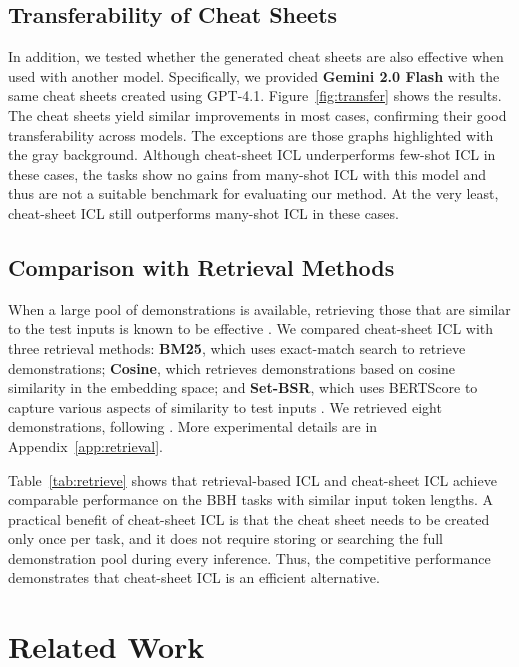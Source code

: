 \documentclass[11pt]{article}
\begin{document}
\subsection{Transferability of Cheat Sheets}
\label{sec:transfer}
In addition, we tested whether the generated cheat sheets are also effective when used with another model.
Specifically, we provided \textbf{Gemini 2.0 Flash} with the same cheat sheets created using GPT-4.1.
Figure~\ref{fig:transfer} shows the results.
The cheat sheets yield similar improvements in most cases, confirming their good transferability across models.
The exceptions are those graphs highlighted with the \colorbox{backgray}{gray background}.
Although cheat-sheet ICL underperforms few-shot ICL in these cases, the tasks show no gains from many-shot ICL with this model and thus are not a suitable benchmark for evaluating our method.
At the very least, cheat-sheet ICL still outperforms many-shot ICL in these cases.


\subsection{Comparison with Retrieval Methods}
\label{sec:retrieval}

When a large pool of demonstrations is available, retrieving those that are similar to the test inputs is known to be effective \citep{liu-etal-2022-makes}.
We compared cheat-sheet ICL with three retrieval methods: \textbf{BM25}, which uses exact-match search to retrieve demonstrations; \textbf{Cosine}, which retrieves demonstrations based on cosine similarity in the embedding space; and \textbf{Set-BSR}, which uses BERTScore \citep{Zhang2020BERTScore:} to capture various aspects of similarity to test inputs \citep{gupta-etal-2023-coverage}.
We retrieved eight demonstrations, following \citet{gupta-etal-2023-coverage}.
More experimental details are in Appendix~\ref{app:retrieval}.

Table~\ref{tab:retrieve} shows that retrieval-based ICL and cheat-sheet ICL achieve comparable performance on the BBH tasks with similar input token lengths.
A practical benefit of cheat-sheet ICL is that the cheat sheet needs to be created only once per task, and it does not require storing or searching the full demonstration pool during every inference.
Thus, the competitive performance demonstrates that cheat-sheet ICL is an efficient alternative.





\section{Related Work}
\label{sec:realted_work}
\end{document}
